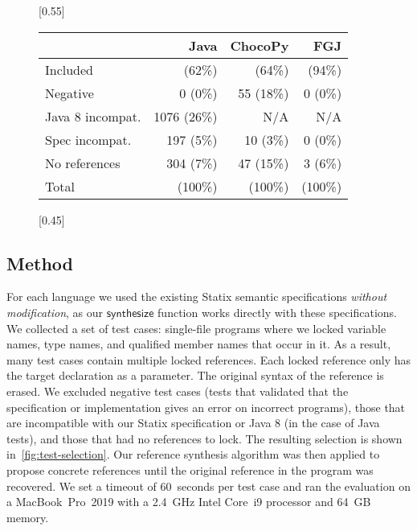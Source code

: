 \begin{figure}[t]
  [0.55\textwidth]{
    \footnotesize
    \begin{tabular}{|l|r|r|r|}
      \hline
                            &                     Java &                     ChocoPy &                    FGJ \\
      \hline
      \hline
      Included              & \javaTotalTests{} (62\%) & \chocopyTotalTests{} (64\%) & \fgjTotalTests{} (94\%) \\
      \hline
      Negative              &                0   (0\%) &                  55  (18\%) &               0   (0\%) \\
      Java 8 incompat.      &             1076  (26\%) &                 N/A         &             N/A         \\
      Spec incompat.        &              197   (5\%) &                  10   (3\%) &               0   (0\%) \\
      No references         &              304   (7\%) &                  47  (15\%) &               3   (6\%) \\
      \hline
      Total                 & \javaOriginalTestSet{} (100\%) & \chocopyOriginalTestSet{} (100\%) & \fgjOriginalTestSet{} (100\%) \\
      \hline
    \end{tabular}%
  }%
  \hfill
  [0.45\textwidth]{
    \footnotesize
    
  }%
\end{figure}

\subsection{Method}
For each language we used the existing Statix semantic specifications \emph{without modification}, as our $\mathsf{synthesize}$ function works directly with these specifications.
We collected a set of test cases: single-file programs where we locked variable names, type names, and qualified member names that occur in it.
As a result, many test cases contain multiple locked references.
Each locked reference only has the target declaration as a parameter.
The original syntax of the reference is erased.
We excluded negative test cases (tests that validated that the specification or implementation gives an error on incorrect programs), those that are incompatible with our Statix specification or Java 8 (in the case of Java tests), and those that had no references to lock.
The resulting selection is shown in~\cref{fig:test-selection}.
Our reference synthesis algorithm was then applied to propose concrete references until the original reference in the program was recovered.
We set a timeout of 60~seconds per test case and ran the evaluation on a MacBook~Pro~2019 with a 2.4~GHz Intel Core~i9 processor and 64~GB memory.




